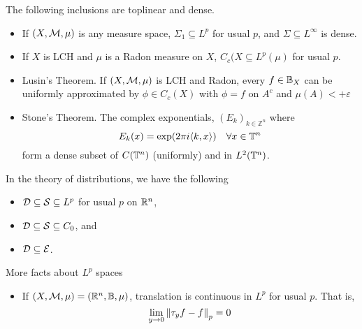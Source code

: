\documentclass[../main-v2-manifolds.tex]{subfiles}
\begin{document}
\begin{lemma}
    The following inclusions are toplinear and dense.
    \begin{itemize}
        \item If $(X,\mathcal{M},\mu)$ is any measure space, $\Sigma_1\subseteq L^p$ for usual $p$, and $\Sigma\subseteq L^\infty$ is dense.
        \item If $X$ is LCH and $\mu$ is a Radon measure on $X$, $C_c(X\subseteq L^p(\mu)$ for usual $p$.
        \item Lusin's Theorem. If $(X,\mathcal{M},\mu)$ is LCH and Radon, every $f\in{\mathbb{B}}_X$ can be uniformly approximated by $\phi\in C_c(X)$ with $\phi=f$ on $A^c$ and $\mu(A)<+\varepsilon$
        \item Stone's Theorem. The complex exponentials, $(E_k)_{k\in\mathbb{Z}^n}$ where
        \[
            E_k(x) = \operatorname{exp}(2\pi i\langle k,x\rangle)\quad\forall x\in\mathbb{T}^n
        \]
        form a dense subset of $C(\mathbb{T}^n)$ (uniformly) and in $L^2(\mathbb{T}^n)$.
    \end{itemize}
    In the theory of distributions, we have the following
    \begin{itemize}
        \item $\mathcal{D}\subseteq\mathcal{S}\subseteq L^p$ for usual $p$ on ${\mathbb{R}^n}$, 
        \item $\mathcal{D}\subseteq\mathcal{S}\subseteq C_0$, and
        \item $\mathcal{D}\subseteq\mathcal{E}$.
    \end{itemize}
\end{lemma}
More facts about $L^p$ spaces
\begin{itemize}
    \item If $(X,\mathcal{M},\mu) = ({\mathbb{R}^n},{\mathbb{B}},\mu)$, translation is continuous in $L^p$ for usual $p$. That is,
    \[
        \lim_{y\to 0}\norm{\tau_y f-f}_p = 0
    \]
\end{itemize}

\end{document}
